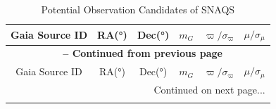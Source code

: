 \begin{longtable}{c c c c c c}
\caption{Potential Observation Candidates of SNAQS}
\label{tab:obs_plan} \\

\toprule
Gaia Source ID & RA(\unit{\degree}) & Dec(\unit{\degree}) & $m_G$ & $\varpi/\sigma_\varpi$ & $\mu/\sigma_\mu$ \\
\midrule
\endfirsthead %

\multicolumn{6}{c}{{\bfseries \tablename\ \thetable{} -- Continued from previous page}} \\
\toprule
Gaia Source ID & RA(\unit{\degree}) & Dec(\unit{\degree}) & $m_G$ & $\varpi/\sigma_\varpi$ & $\mu/\sigma_\mu$ \\
\midrule
\endhead %

\midrule
\multicolumn{6}{r}{{Continued on next page...}} \\
\endfoot %

\bottomrule
\endlastfoot %


\end{longtable}
